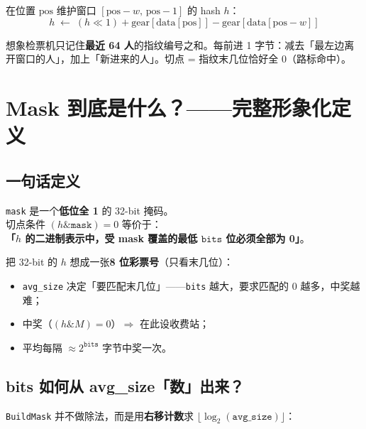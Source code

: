 在位置 $\text{pos}$ 维护窗口 $[\text{pos}-w,\,\text{pos}-1]$ 的 hash $h$：
\begin{equation}
  h \;\leftarrow\; (h \ll 1) + \text{gear}[\text{data}[\text{pos}]] - \text{gear}[\text{data}[\text{pos}-w]]
  \label{eq:gear-roll}
\end{equation}

\begin{analogybox}[64 字节检票机]
想象检票机只记住\textbf{最近 64 人}的指纹编号之和。每前进 1 字节：减去「最左边离开窗口的人」，加上「新进来的人」。切点 = 指纹末几位恰好全 0（路标命中）。
\end{analogybox}

\section{Mask 到底是什么？——完整形象化定义}\label{sec:mask-visual}

\subsection{一句话定义}

\begin{corebox}
\texttt{mask} 是一个\textbf{低位全 1} 的 32-bit 掩码。\\
切点条件 $(h \mathbin{\&} \texttt{mask}) = 0$ 等价于：\\
\textbf{「$h$ 的二进制表示中，受 mask 覆盖的最低 $\texttt{bits}$ 位必须全部为 0」}。
\end{corebox}

\begin{analogybox}[彩票末位规则]
把 32-bit 的 $h$ 想成一张\textbf{8 位彩票号}（只看末几位）：
\begin{itemize}[nosep]
  \item \texttt{avg\_size} 决定「要匹配末几位」——\texttt{bits} 越大，要求匹配的 0 越多，中奖越难；
  \item 中奖（$(h \mathbin{\&} M)=0$）$\Rightarrow$ 在此设收费站；
  \item 平均每隔 $\approx 2^{\texttt{bits}}$ 字节中奖一次。
\end{itemize}
\end{analogybox}

\subsection{bits 如何从 avg\_size「数」出来？}

\texttt{BuildMask} 并不做除法，而是用\textbf{右移计数}求 $\lfloor\log_2(\texttt{avg\_size})\rfloor$：


